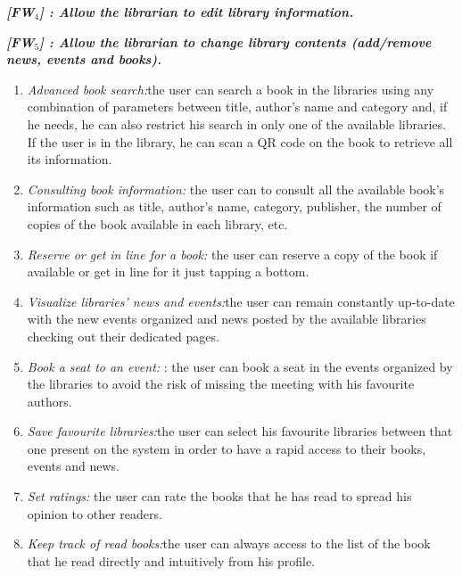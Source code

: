 \vspace{0.5cm}
\noindent
\emph{\textbf{[FW$_{4}$] : Allow the librarian to edit library information.}}

\vspace{0.5cm}
\noindent
\emph{\textbf{[FW$_{5}$] : Allow the librarian to change library contents (add/remove news, events and books).}}

\vspace{0.5cm}
\vspace{0.5cm}
\begin{enumerate}
\item \emph{Advanced book search:}the user can search a book in the libraries using any combination of parameters between title, author’s name and category and, if he needs, he can also restrict his search in only one of the available libraries. If the user is in the library, he can scan a QR code on the book to retrieve all its information.
\item \emph{Consulting book information:} the user can to consult all the available book’s information such as title, author’s name, category, publisher, the number of copies of the book available in each library, etc.
\item \emph{Reserve or get in line for a book:} the user can reserve a copy of the book if available or get in line for it just tapping a bottom.
\item \emph{Visualize libraries’ news and events:}the user can remain constantly up-to-date with the new events organized and news posted by the available libraries checking out their dedicated pages. 
\item \emph{Book a seat to an event:} : the user can book a seat in the events organized by the libraries to avoid the risk of missing the meeting with his favourite authors.
\item \emph{Save favourite libraries:}the user can select his favourite libraries between that one present on the system in order to have a rapid access to their books, events and news. 
\item \emph{Set ratings:} the user can rate the books that he has read to spread his opinion to other readers.
\item \emph{Keep track of read books:}the user can always access to the list of the book that he read directly and intuitively from his profile.
\end{enumerate}

